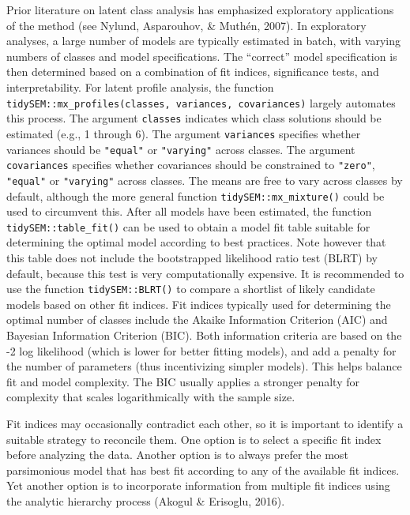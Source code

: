\documentclass[
  ,man]{apa6}
\begin{document}
Prior literature on latent class analysis has emphasized exploratory applications of the method (see Nylund, Asparouhov, \& Muthén, 2007).
In exploratory analyses, a large number of models are typically estimated in batch,
with varying numbers of classes and model specifications.
The ``correct'' model specification is then determined based on a combination of fit indices,
significance tests,
and interpretability.
For latent profile analysis, the function \texttt{tidySEM::mx\_profiles(classes,\ variances,\ covariances)}
largely automates this process.
The argument \texttt{classes} indicates which class solutions should be estimated (e.g., 1 through 6).
The argument \texttt{variances} specifies whether variances should be \texttt{"equal"} or \texttt{"varying"} across classes.
The argument \texttt{covariances} specifies whether covariances should be constrained to \texttt{"zero"}, \texttt{"equal"} or \texttt{"varying"} across classes.
The means are free to vary across classes by default, although the more general function \texttt{tidySEM::mx\_mixture()} could be used to circumvent this.
After all models have been estimated, the function \texttt{tidySEM::table\_fit()} can be used to obtain a model fit table suitable for determining the optimal model according to best practices.
Note however that this table does not include the bootstrapped likelihood ratio test (BLRT) by default,
because this test is very computationally expensive.
It is recommended to use the function \texttt{tidySEM::BLRT()} to compare a shortlist of likely candidate models based on other fit indices.
Fit indices typically used for determining the optimal number of classes include
the Akaike Information Criterion (AIC) and Bayesian Information Criterion (BIC).
Both information criteria are based on the -2 log likelihood (which is lower for better fitting models),
and add a penalty for the number of parameters (thus incentivizing simpler models).
This helps balance fit and model complexity.
The BIC usually applies a stronger penalty for complexity that scales logarithmically with the sample size.

Fit indices may occasionally contradict each other, so it is important to identify a suitable strategy to reconcile them.
One option is to select a specific fit index before analyzing the data.
Another option is to always prefer the most parsimonious model that has best fit according to any of the available fit indices.
Yet another option is to incorporate information from multiple fit indices using the analytic hierarchy process (Akogul \& Erisoglu, 2016).
\end{document}
